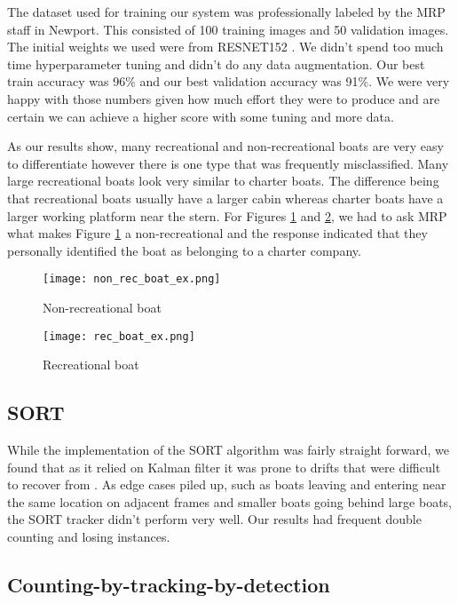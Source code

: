 \documentclass[10pt,twocolumn,letterpaper]{article}
\begin{document}
The dataset used for training our system was professionally labeled by the MRP staff in Newport. This consisted of 100 training images and 50 validation images. The initial weights we used were from RESNET152 \cite{PyTorch_RESNET152}. We didn't spend too much time hyperparameter tuning and didn't do any data augmentation. Our best train accuracy was 96\% and our best validation accuracy was 91\%. We were very happy with those numbers given how much effort they were to produce and are certain we can achieve a higher score with some tuning and more data.

As our results show, many recreational and non-recreational boats are very easy to differentiate however there is one type that was frequently misclassified. Many large recreational boats look very similar to charter boats. The difference being that recreational boats usually have a larger cabin whereas charter boats have a larger working platform near the stern. For Figures \ref{fig:non_rec_boat} and \ref{fig:rec_boat}, we had to ask MRP what makes Figure \ref{fig:non_rec_boat} a non-recreational and the response indicated that they personally identified the boat as belonging to a charter company.

\begin{figure}
 \center
  \texttt{[image: non\_rec\_boat\_ex.png]}
  \caption{Non-recreational boat}
  \label{fig:non_rec_boat}
\end{figure}

\begin{figure}
 \center
  \texttt{[image: rec\_boat\_ex.png]}
  \caption{Recreational boat}
  \label{fig:rec_boat}
\end{figure}

\subsection{SORT}

While the implementation of the SORT algorithm was fairly straight forward, we found that as it relied on Kalman filter it was prone to drifts that were difficult to recover from \cite{10.1007/978-3-540-24670-1_3}. As edge cases piled up, such as boats leaving and entering near the same location on adjacent frames and smaller boats going behind large boats, the SORT tracker didn't perform very well. Our results had frequent double counting and losing instances.

\subsection{Counting-by-tracking-by-detection}
\end{document}
